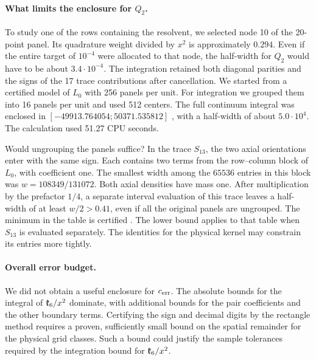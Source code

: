 \paragraph{What limits the enclosure for $Q_2$.}
To study one of the rows containing the resolvent, we selected node 10 of the 20-point panel. Its
quadrature weight divided by $x^2$ is approximately $0.294$. Even if the entire target of
$10^{-4}$ were allocated to that node, the half-width for $Q_2$ would have to be about
$3.4\cdot10^{-4}$. The integration retained both diagonal parities and the signs of the 17 trace
contributions after cancellation. We started from a certified model of $L_0$ with 256 panels per
unit. For integration we grouped them into 16 panels per unit and used 512 centers. The full
continuum integral was enclosed in $[-49913.764054;50371.535812]$ , with a half-width of about
$5.0\cdot10^4$. The calculation used 51.27 CPU seconds.

Would ungrouping the panels suffice? In the trace $S_{13}$, the two axial orientations enter with
the same sign. Each contains two terms from the row--column block of $L_0$, with coefficient one.
The smallest width among the $65536$ entries in this block was $w=108349/131072$. Both axial
densities have mass one. After multiplication by the prefactor $1/4$, a separate interval
evaluation of this trace leaves a half-width of at least $w/2>0.41$, even if all the original
panels are ungrouped. The minimum in the table is certified . The lower bound 
applies to
that table when $S_{13}$ is evaluated separately. The identities for the physical kernel may
constrain its entries more tightly.

\paragraph{Overall error budget.}\label{par:balance-global}
We did not obtain a useful enclosure for $c_{\mathrm{err}}$. The absolute bounds for the integral of
$\mathfrak{k}_6/x^2$ dominate, with additional bounds for the pair coefficients and the other boundary
terms. Certifying the sign and decimal digits by the rectangle method requires a proven,
sufficiently small bound on the spatial remainder for the physical grid classes. Such a bound
could justify the sample tolerances required by the integration bound for $\mathfrak{k}_6/x^2$.
